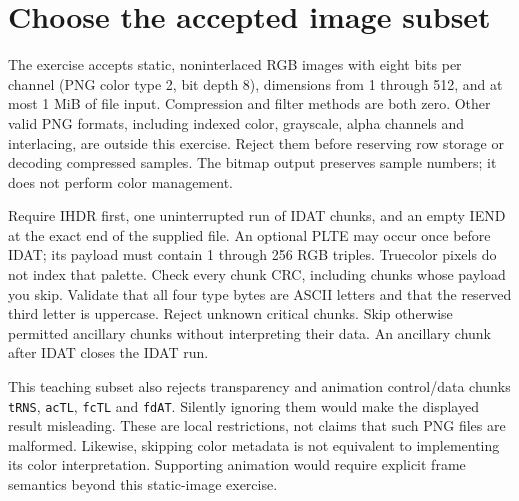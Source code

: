 \section{Choose the accepted image subset}
The exercise accepts static, noninterlaced RGB images with eight bits per channel
(PNG color type 2, bit depth 8), dimensions from 1 through 512, and at most 1 MiB of
file input. Compression and filter methods are both zero. Other valid PNG formats,
including indexed color, grayscale, alpha channels and interlacing, are outside this
exercise. Reject them before reserving row storage or decoding compressed samples.
The bitmap output preserves sample numbers; it does not perform color management.

Require IHDR first, one uninterrupted run of IDAT chunks, and an empty IEND at the
exact end of the supplied file. An optional PLTE may occur once before IDAT; its
payload must contain 1 through 256 RGB triples. Truecolor pixels do not index that
palette. Check every chunk CRC, including chunks whose payload you skip. Validate
that all four type bytes are ASCII letters and that the reserved third letter is
uppercase. Reject unknown critical chunks. Skip otherwise permitted ancillary chunks
without interpreting their data. An ancillary chunk after IDAT closes the IDAT run.

This teaching subset also rejects transparency and animation control/data chunks
\texttt{tRNS}, \texttt{acTL}, \texttt{fcTL} and \texttt{fdAT}. Silently ignoring them
would make the displayed result misleading. These are local restrictions, not claims
that such PNG files are malformed. Likewise, skipping color metadata is not equivalent
to implementing its color interpretation. Supporting animation would require explicit frame semantics
beyond this static-image exercise.
